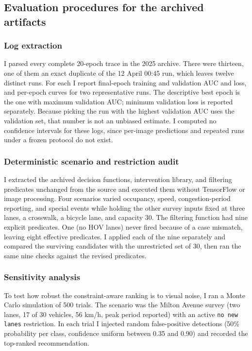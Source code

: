 \documentclass[11pt]{article}
\begin{document}
\subsection{Evaluation procedures for the archived artifacts}
\label{sec:archive-eval}

\subsubsection*{Log extraction}
I parsed every complete 20-epoch trace in the 2025 archive. There were thirteen, one of them an exact duplicate of the 12 April 00:45 run, which leaves twelve distinct runs. For each I report final-epoch training and validation AUC and loss, and per-epoch curves for two representative runs. The descriptive best epoch is the one with maximum validation AUC; minimum validation loss is reported separately. Because picking the run with the highest validation AUC uses the validation set, that number is not an unbiased estimate. I computed no confidence intervals for these logs, since per-image predictions and repeated runs under a frozen protocol do not exist.

\subsubsection*{Deterministic scenario and restriction audit}
I extracted the archived decision functions, intervention library, and filtering predicates unchanged from the source and executed them without TensorFlow or image processing. Four scenarios varied occupancy, speed, congestion-period reporting, and special events while holding the other survey inputs fixed at three lanes, a crosswalk, a bicycle lane, and capacity 30. The filtering function had nine explicit predicates. One (no HOV lanes) never fired because of a case mismatch, leaving eight effective predicates. I applied each of the nine separately and compared the surviving candidates with the unrestricted set of 30, then ran the same nine checks against the revised predicates.

\subsubsection*{Sensitivity analysis}
To test how robust the constraint-aware ranking is to visual noise, I ran a Monte Carlo simulation of 500 trials. The scenario was the Milton Avenue survey (two lanes, 17 of 30 vehicles, 56 km/h, peak period reported) with an active \texttt{no new lanes} restriction. In each trial I injected random false-positive detections (50\% probability per class, confidence uniform between 0.35 and 0.90) and recorded the top-ranked recommendation.
\end{document}
